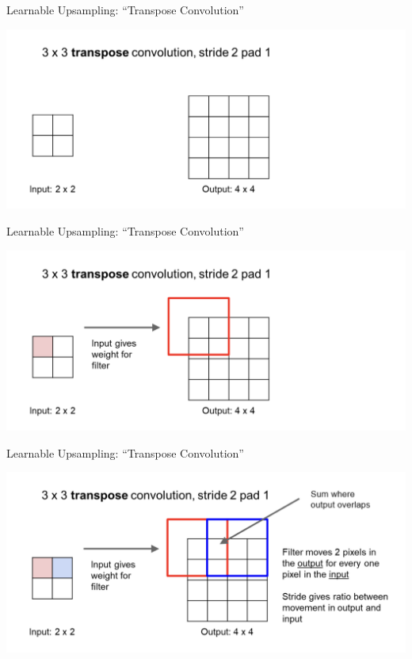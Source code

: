 \documentclass[serif, aspectratio=169]{beamer}
\begin{document}
\begin{frame}{Learnable Upsampling: “Transpose Convolution”}

    \begin{center}
        \includegraphics[width=\textwidth]{pic/Transpose conv eg7.png} 
    \end{center}
\end{frame}

\begin{frame}{Learnable Upsampling: “Transpose Convolution”}

    \begin{center}
        \includegraphics[width=\textwidth]{pic/Transpose conv eg8.png} 
    \end{center}
\end{frame}

\begin{frame}{Learnable Upsampling: “Transpose Convolution”}

    \begin{center}
        \includegraphics[width=\textwidth]{pic/Transpose conv eg9.png} 
    \end{center}
\end{frame}
\end{document}

